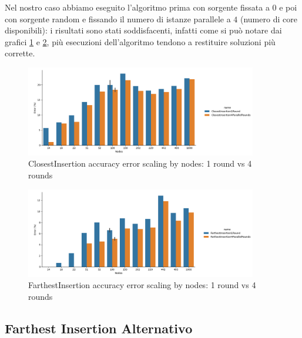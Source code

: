 \noindent Nel nostro caso abbiamo eseguito l'algoritmo prima con
sorgente fissata a $0$ e poi con sorgente random e fissando il numero
di istanze parallele a $4$ (numero di core disponibili): i risultati
sono stati soddisfacenti, infatti come si può notare dai grafici
\ref{fig:closest-insertion-1-4-rounds-accuracy-error} e
\ref{fig:farthest-insertion-1-4-rounds-accuracy-error}, più esecuzioni
dell'algoritmo tendono a restituire soluzioni più corrette.\\

\begin{figure}[!ht]
    \centering

    \includegraphics[width=0.9\textwidth]{./images/ClosestInsertion1Round_vs_ClosestInsertion4ParallelRounds__approximation_error_.png}

    \caption{ClosestInsertion accuracy error scaling by nodes: 1 round vs 4 rounds}
    \label{fig:closest-insertion-1-4-rounds-accuracy-error}
\end{figure}

\begin{figure}[!ht]
    \centering

    \includegraphics[width=0.9\textwidth]{./images/FarthestInsertion1Round_vs_FarthestInsertion4ParallelRounds__approximation_error_.png}

    \caption{FarthestInsertion accuracy error scaling by nodes: 1 round vs 4 rounds}
    \label{fig:farthest-insertion-1-4-rounds-accuracy-error}
\end{figure}

\subsection{Farthest Insertion Alternativo}
\label{alg:farthest-insertion-alt}

